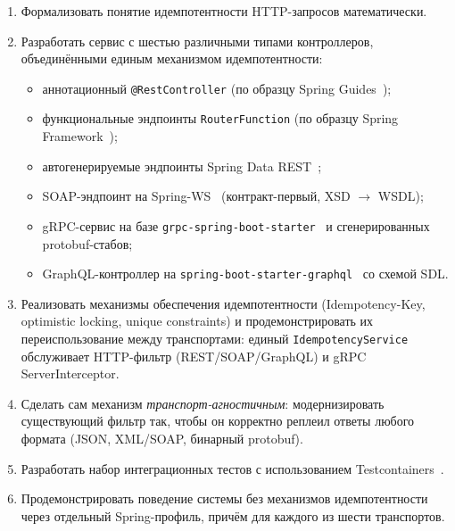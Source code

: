 \begin{enumerate}
    \item Формализовать понятие идемпотентности HTTP-запросов математически.
    \item Разработать сервис с шестью различными типами контроллеров, объединёнными единым механизмом идемпотентности:
    \begin{itemize}
        \item аннотационный \texttt{@RestController} (по образцу Spring Guides~\cite{spring-guides-rest});
        \item функциональные эндпоинты \texttt{RouterFunction} (по образцу Spring Framework~\cite{spring-functional-endpoints});
        \item автогенерируемые эндпоинты Spring Data REST~\cite{spring-data-rest-guide};
        \item SOAP-эндпоинт на Spring-WS~\cite{spring-ws} (контракт-первый, XSD $\to$ WSDL);
        \item gRPC-сервис на базе \texttt{grpc-spring-boot-starter}~\cite{grpc-java} и сгенерированных protobuf-стабов;
        \item GraphQL-контроллер на \texttt{spring-boot-starter-graphql}~\cite{spring-graphql} со схемой SDL.
    \end{itemize}
    \item Реализовать механизмы обеспечения идемпотентности (Idempotency-Key, optimistic locking, unique constraints) и продемонстрировать их переиспользование между транспортами: единый \texttt{IdempotencyService} обслуживает HTTP-фильтр (REST/SOAP/GraphQL) и gRPC ServerInterceptor.
    \item Сделать сам механизм \emph{транспорт-агностичным}: модернизировать существующий фильтр так, чтобы он корректно реплеил ответы любого формата (JSON, XML/SOAP, бинарный protobuf).
    \item Разработать набор интеграционных тестов с использованием Testcontainers~\cite{testcontainers}.
    \item Продемонстрировать поведение системы без механизмов идемпотентности через отдельный Spring-профиль, причём для каждого из шести транспортов.
\end{enumerate}
